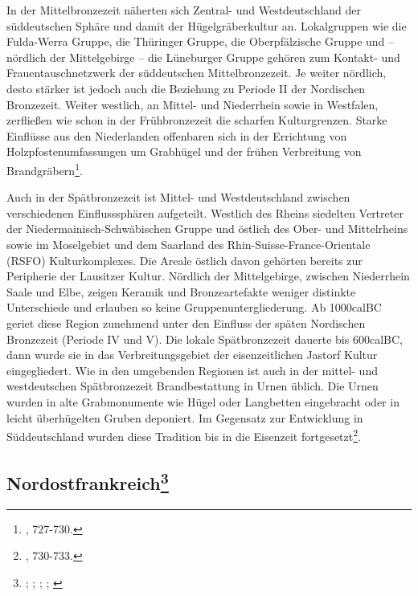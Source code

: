\documentclass[openany,twoside,twocolumn]{book}
\let\rmarkdownfootnote\footnote%
\def\footnote{\protect\rmarkdownfootnote}
\begin{document}
In der Mittelbronzezeit näherten sich Zentral- und Westdeutschland der
süddeutschen Sphäre und damit der Hügelgräberkultur an. Lokalgruppen wie
die Fulda-Werra Gruppe, die Thüringer Gruppe, die Oberpfälzische Gruppe
und -- nördlich der Mittelgebirge -- die Lüneburger Gruppe gehören zum
Kontakt- und Frauentauschnetzwerk der süddeutschen Mittelbronzezeit. Je
weiter nördlich, desto stärker ist jedoch auch die Beziehung zu Periode
II der Nordischen Bronzezeit. Weiter westlich, an Mittel- und
Niederrhein sowie in Westfalen, zerfließen wie schon in der
Frühbronzezeit die scharfen Kulturgrenzen. Starke Einflüsse aus den
Niederlanden offenbaren sich in der Errichtung von
Holzpfostenumfassungen um Grabhügel und der frühen Verbreitung von
Brandgräbern\footnote{\textcite{jockenhovel_germany_2013}, 727-730.}.

Auch in der Spätbronzezeit ist Mittel- und Westdeutschland zwischen
verschiedenen Einflusssphären aufgeteilt. Westlich des Rheins siedelten
Vertreter der Niedermainisch-Schwäbischen Gruppe und östlich des Ober-
und Mittelrheins sowie im Moselgebiet und dem Saarland des
Rhin-Suisse-France-Orientale (RSFO) Kulturkomplexes. Die Areale östlich
davon gehörten bereits zur Peripherie der Lausitzer Kultur. Nördlich der
Mittelgebirge, zwischen Niederrhein Saale und Elbe, zeigen Keramik und
Bronzeartefakte weniger distinkte Unterschiede und erlauben so keine
Gruppenuntergliederung. Ab 1000calBC geriet diese Region zunehmend unter
den Einfluss der späten Nordischen Bronzezeit (Periode IV und V). Die
lokale Spätbronzezeit dauerte bis 600calBC, dann wurde sie in das
Verbreitungsgebiet der eisenzeitlichen Jastorf Kultur eingegliedert. Wie
in den umgebenden Regionen ist auch in der mittel- und westdeutschen
Spätbronzezeit Brandbestattung in Urnen üblich. Die Urnen wurden in alte
Grabmonumente wie Hügel oder Langbetten eingebracht oder in leicht
überhügelten Gruben deponiert. Im Gegensatz zur Entwicklung in
Süddeutschland wurden diese Tradition bis in die Eisenzeit
fortgesetzt\footnote{\textcite{jockenhovel_germany_2013}, 730-733.}.

\hypertarget{nordostfrankreich}{%
\subsection[Nordostfrankreich]{\texorpdfstring{Nordostfrankreich\footnote{\textcite{bourgeois_lage_2005-1};
  \textcite{briard_groupe_1988}; \textcite{gomez_bronze_1995};
  \textcite{mordant_bronze_2013}; \textcite{mordant_les_2005}}}{Nordostfrankreich}}\label{nordostfrankreich}}
\end{document}
